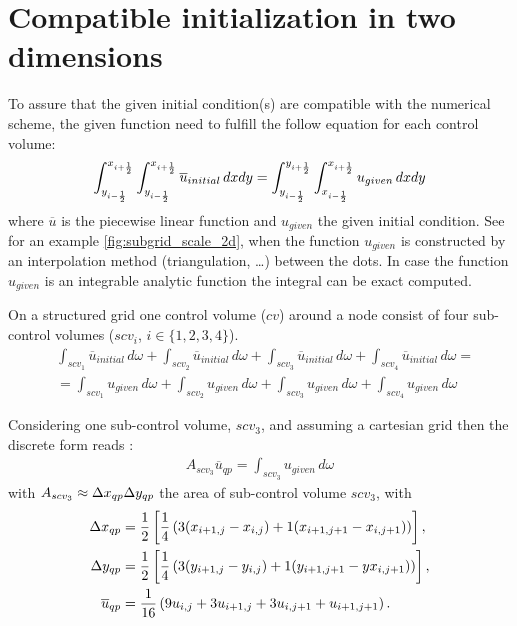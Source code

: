 \section{Compatible initialization in two dimensions}\label{sec:compatible_initialization_2d}
To assure that the given initial condition(s) are compatible with the numerical scheme, the given function need to fulfill the follow equation for each control volume:
\begin{align}
    \int_{y_{i-\frac{1}{2}}}^{x_{i+\frac{1}{2}}} \int_{y_{i-\frac{1}{2}}}^{x_{i+\frac{1}{2}}} \overline u_{initial}\, dxdy = \int_{y_{i-\frac{1}{2}}}^{y_{i+\frac{1}{2}}} \int_{x_{i-\frac{1}{2}}}^{x_{i+\frac{1}{2}}} u_{given}\, dxdy \label{eq:compatible_initialization_2d}
\end{align}
where $\overline{u}$ is the piecewise linear function and $u_{given}$ the given initial condition.
See for an example \autoref{fig:subgrid_scale_2d}, when the function $u_{given}$ is constructed by an interpolation method (triangulation, \ldots) between the dots.
In case the function $u_{given}$ is an integrable analytic function the integral can be exact computed.

On a structured grid one control volume ($cv$) around a node consist of four sub-control volumes ($scv_i$, $i\in\{1,2,3,4\}$).
\begin{align}
    &\int_{scv_1} \overline u_{initial}\, d\omega +
    \int_{scv_2} \overline u_{initial}\, d\omega +
    \int_{scv_3} \overline u_{initial}\, d\omega +
    \int_{scv_4} \overline u_{initial}\, d\omega
    =
    \nonumber \\
    & =\int_{scv_1} u_{given}\, d\omega +
    \int_{scv_2} u_{given}\, d\omega +
    \int_{scv_3} u_{given}\, d\omega +
    \int_{scv_4} u_{given}\, d\omega
\end{align}

Considering one sub-control volume, $scv_3$, and assuming a
cartesian grid then the discrete form reads :
\begin{align}
A_{scv_3} \overline{u}_{qp} = \int_{scv_3} u_{given}\, d\omega
\end{align}
with $A_{scv_3} \approx \Delta x_{qp}\Delta y_{qp}$ the area of sub-control volume $scv_3$, with
\begin{align}
    \Delta x_{qp} & = \frac{1}{2}\left[\frac{1}{4}\left( 3 (x_{i+1,j} - x_{i,j}) + 1 (x_{i+1,j+1} - x_{i,j+1}) \right)\right],
    \\
    \Delta y_{qp} & = \frac{1}{2}\left[\frac{1}{4}\left( 3 (y_{i+1,j} - y_{i,j}) + 1 (y_{i+1,j+1} - yx_{i,j+1}) \right)\right],
    \\
    \overline{u}_{qp} & = \frac{1}{16} \left( 9 u_{i,j} + 3 u_{i+1,j} + 3 u_{i, j+1} + u_{i+1, j+1} \right).
\end{align}

